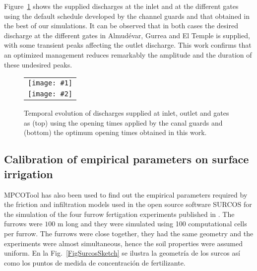 \documentclass[review,authoryear]{elsarticle}
\newcommand{\FIGII}[4]
{
	\begin{figure}[ht!]
		\centering
		\begin{tabular}{c}
			\texttt{[image: \#1]} \\ \texttt{[image: \#2]}
		\end{tabular}
		\caption{#3.\label{#4}}
	\end{figure}
}
\begin{document}
Figure~\ref{FigSwigs} shows the supplied discharges at the inlet and at the different
gates using the default schedule developed by the channel guards and that 
obtained in the best of our simulations. It can be observed that in both cases 
the desired discharge at the different gates in Almudévar, Gurrea and El Temple is supplied,
with some transient peaks affecting the outlet discharge.
This work confirms that an optimized management reduces remarkably the amplitude and the duration of these undesired peaks.

\FIGII{Violada-contributions.eps}{Violada-optimized-contributions.eps}
{Temporal evolution of discharges supplied at inlet, outlet and gates as (top)
using the opening times applied by the canal guards and (bottom) the optimum
opening times obtained in this work}{FigSwigs}

\subsection{Calibration of empirical parameters on surface irrigation}

MPCOTool has also been used to find out the empirical parameters required by the friction and infiltration
models used in the open source software SURCOS \citep{Surcos,SurcosGit,JaviSurcos3} for the simulation of the four furrow fertigation experiments published in \citet{JaviSurcos2}. The furrows were $100$ m long and they were simulated using 100 computational cells per furrow. The furrows were close together, they had the same geometry and the experiments were almost simultaneous, hence the soil properties were assumed uniform. En la Fig.~\ref{FigSurcosSketch} se ilustra la
geometría de los surcos así como los puntos de medida de concentración de
fertilizante.
\end{document}
